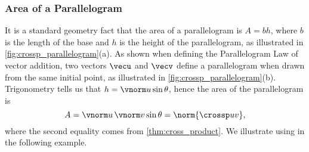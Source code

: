 \subsubsection*{Area of a Parallelogram}

It is a standard geometry fact that the area of a parallelogram is $A = bh$, where $b$ is the length of the base and $h$ is the height of the parallelogram, as illustrated in \autoref{fig:crossp_parallelogram}(a). As shown when defining the Parallelogram Law of vector addition, two vectors $\vecu$ and $\vecv$ define a parallelogram when drawn from the same initial point, as illustrated in \autoref{fig:crossp_parallelogram}(b). Trigonometry tells us that $h = \vnorm u \sin \theta$, hence the area of the parallelogram is 
\begin{equation}A = \vnorm u\,\vnorm v\sin\theta = \norm{\crossp uv},\label{eq:crossp1}\end{equation}
where the second equality comes from \autoref{thm:cross_product}.
We illustrate using  in the following example.

